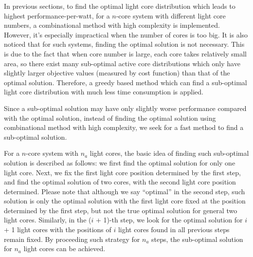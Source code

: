 In previous sections, to find the optimal light core distribution which leads to highest performance-per-watt, for a $n$-core system with different light core numbers, a combinational method with high complexity is implemented. However, it's  especially impractical when the number of cores is too big. It is also noticed that for such systems, finding the optimal solution is not necessary. This is due to the fact that when core number is large, each core takes relatively small area, so there exist many sub-optimal active core distributions which only have slightly larger objective values (measured by cost function) than that of the optimal solution. Therefore, a greedy based method which can find a sub-optimal light core distribution with much less time consumption is applied. 

Since a sub-optimal solution may have only slightly worse performance compared with the optimal solution, instead of finding the optimal solution using combinational method with high complexity, we seek for a fast method to find a sub-optimal solution.

For a $n$-core system with $n_{a}$ light cores, the basic idea of finding such sub-optimal solution is described as follows: we first find the optimal solution for only one light core. Next, we fix the first light core position determined by the first step, and find the optimal solution of two cores, with the second light core position determined. Please note that although we say “optimal” in the second step, such solution is only the optimal solution with the first light core fixed at the position determined by the first step, but not the true optimal solution for general two light cores. Similarly, in the ($i$ + 1)-th step, we look for the optimal solution for $i$ + 1 light cores with the positions of $i$ light cores found in all previous steps remain fixed. By proceeding such strategy for $n_{a}$ steps, the sub-optimal solution for $n_{a}$ light cores can be achieved.
